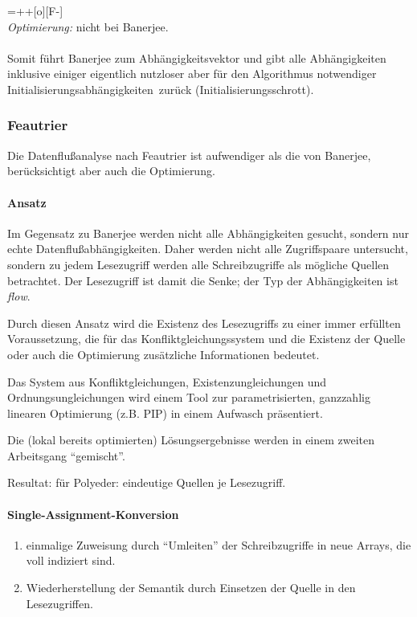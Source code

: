 \entrymodifiers={++[o][F-]}
~\\
\textit{Optimierung:} nicht bei Banerjee.\\
~\\
Somit führt Banerjee zum Abhängigkeitsvektor und gibt alle Abhängigkeiten inklusive einiger eigentlich nutzloser aber für den Algorithmus notwendiger \glqq Initialisierungsabhängigkeiten\grqq\ zurück (Initialisierungsschrott).


\subsubsection{Feautrier}
Die Datenflußanalyse nach Feautrier \cite{Fea91} ist aufwendiger als die von
Banerjee, berücksichtigt aber auch die Optimierung.

\paragraph{Ansatz}
Im Gegensatz zu Banerjee werden nicht alle Abhängigkeiten gesucht,
sondern nur echte Datenflußabhängigkeiten. Daher werden nicht alle
Zugriffspaare untersucht, sondern zu jedem Lesezugriff werden alle
Schreibzugriffe als mögliche Quellen betrachtet. Der Lesezugriff ist
damit die Senke; der Typ der Abhängigkeiten ist \emph{flow}.

Durch diesen Ansatz wird die Existenz des Lesezugriffs zu einer immer
erfüllten Voraussetzung, die für das Konfliktgleichungssystem und die
Existenz der Quelle oder auch die Optimierung zusätzliche Informationen
bedeutet.

Das System aus Konfliktgleichungen, Existenzungleichungen und
Ordnungsungleichungen wird einem Tool zur parametrisierten, ganzzahlig
linearen Optimierung (z.B. PIP) in einem Aufwasch präsentiert.

Die (lokal bereits optimierten) Lösungsergebnisse werden in einem
zweiten Arbeitsgang ``gemischt''.

Resultat: für Polyeder: eindeutige Quellen je Lesezugriff.

\paragraph{Single-Assignment-Konversion}
\begin{enumerate}
\item einmalige Zuweisung durch ``Umleiten'' der Schreibzugriffe in
  neue Arrays, die voll indiziert sind.
\item Wiederherstellung der Semantik durch Einsetzen der Quelle in den
  Lesezugriffen.
\end{enumerate}

